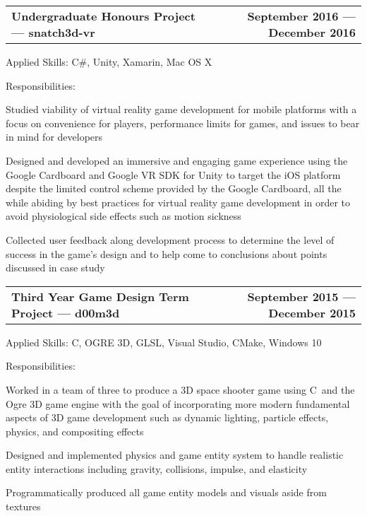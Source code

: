 \documentclass[10pt,letterpaper]{article}
\makeatletter
\newenvironment{indentsection}[1]%
{\begin{list}{}%
  {\setlength{\leftmargin}{#1}}%
  \item[]%
}
{\end{list}}
\newcommand{\headerrow}[2]
{\begin{tabular*}{\linewidth}{l@{\extracolsep{\fill}}r}
  #1 &
  #2 \\
\end{tabular*}}
\newcommand{\CPP}
{C\nolinebreak[4]\hspace{-.05em}\raisebox{.22ex}{\footnotesize\bf ++}}
\makeatother
\begin{document}
\begin{itemize}
  \item
  \headerrow
    {\textbf{Undergraduate Honours Project — snatch3d-vr}}
    {\textbf{September 2016 — December 2016}}
  \begin{indentsection}{1em}
    \begin{description*}
      \item[Applied Skills:]
      C\#, Unity, Xamarin, Mac OS X
      \item[Responsibilities:]
      \hfill
      \begin{itemize*}
        \item Studied viability of virtual reality game development for mobile
        platforms with a focus on convenience for players, performance limits for
        games, and issues to bear in mind for developers
        \item Designed and developed an immersive and engaging game experience
        using the Google Cardboard and Google VR SDK for Unity to target the iOS
        platform despite the limited control scheme provided by the Google
        Cardboard, all the while abiding by best practices for virtual reality
        game development in order to avoid physiological side effects such as
        motion sickness
        \item Collected user feedback along development process to determine the
        level of success in the game’s design and to help come to conclusions
        about points discussed in case study
      \end{itemize*}
    \end{description*}
  \end{indentsection}

  \item
  \headerrow
    {\textbf{Third Year Game Design Term Project — d00m3d}}
    {\textbf{September 2015 — December 2015}}
  \begin{indentsection}{1em}
    \begin{description*}
      \item[Applied Skills:]
      \CPP, OGRE 3D, GLSL, Visual Studio, CMake, Windows 10
      \item[Responsibilities:]
      \hfill
      \begin{itemize*}
        \item Worked in a team of three to produce a 3D space shooter game using
        \CPP\ and the Ogre 3D game engine with the goal of incorporating more
        modern fundamental aspects of 3D game development such as dynamic
        lighting, particle effects, physics, and compositing effects
        \item Designed and implemented physics and game entity system to handle
        realistic entity interactions including gravity, collisions, impulse, and
        elasticity
        \item Programmatically produced all game entity models and visuals aside
        from textures
      \end{itemize*}
    \end{description*}
  \end{indentsection}


\end{itemize}
\end{document}
